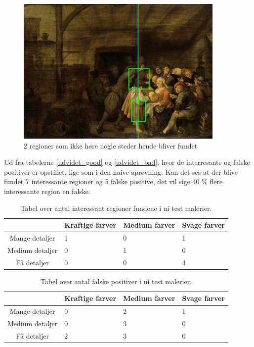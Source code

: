 \begin{figure}[h!!]
	\begin{center}
		\includegraphics[width=0.9\textwidth,angle=0]{afsnit/afprovning/billeder/udvidet_losning/udvidet_sfarver_mdetaljer.png}
	\end{center}
	\caption[]{2 regioner som ikke høre nogle steder hende bliver fundet}
	\label{udvidet_virker_ikke3}
\end{figure}


Ud fra tabelerne \ref{udvidet_good} og \ref{udvidet_bad}, hvor de
interresante og falske positiver er opstillet, lige som i den naive
aprøvning. Kan det ses at der blive fundet 7 interessante regioner og 5
falske positive, det vil sige 40 \% flere interessante region en falske.

\begin{table}[H]
    \centering
    \begin{tabular}{|c|l|l|l|}
           				& Kraftige farver & Medium farver & Svage farver \\\hline
		Mange detaljer	& 1 & 0 & 1 \\\hline
        Medium detaljer & 0 & 1 & 0 \\\hline
        Få detaljer     & 0 & 0 & 4 \\\hline
    \end{tabular}
    \caption[]{Tabel over antal interessant regioner fundene i ni test malerier.}
    \label{naiv_good}
\end{table}

\begin{table}[H]
    \centering
    \begin{tabular}{|c|l|l|l|}
            & Kraftige farver & Medium farver & Svage farver \\\hline
		Mange detaljer	& 0 & 2 & 1 \\\hline
        Medium detaljer  & 0 & 3 & 0 \\\hline
        Få detaljer     & 2 & 3 & 0 \\\hline
    \end{tabular}
    \caption[]{Tabel over antal falske positiver i ni test malerier.}
    \label{naiv_bad}
\end{table}
\clearpage

